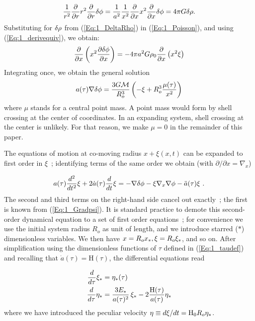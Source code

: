 \begin{equation} 
\label{Eq:1_Poisson} 
\frac{1}{r^2}\frac{\partial}{\partial r} r^2\frac{\partial}{\partial r} \delta\phi =\frac{1}{a^2}\frac{1}{x^2}\frac{\partial}{\partial x} x^2\frac{\partial}{\partial x} \delta\phi  = 4\pi G\delta\rho .
\end{equation}
Substituting for $\delta\rho$ from (\ref{Eq:1_DeltaRho}) in (\ref{Eq:1_Poisson}), and using (\ref{Eq:1_derivequiv}), we obtain:
\begin{equation}
\frac{\partial}{\partial x} \left( x^2 \frac{\partial \delta\phi}{\partial x} \right) = - 4\pi a^2 G \rho_0 \frac{\partial}{\partial x} \left( x^2 \xi \right)
\end{equation}
Integrating once, we obtain the general solution
\begin{equation}
\label{Eq:1_Gradpsi} 
a(\tau)\nabla \delta\phi = \frac{3G{\cal M}}{R_o^3} \left( - \xi + R_o^3\frac{\mu(\tau)}{x^2} \right) 
\end{equation}
where $\mu$ stands for a central point mass. A point mass would form by shell crossing at the center of coordinates. In an expanding system, shell crossing at the center is unlikely. For that reason, we make $ \mu = 0$ in the remainder of this paper.

The equations of motion at co-moving radius $x +\xi(x,t)$ can be expanded to first order in $\xi$~; identifying terms of the same order we obtain (with $\partial/\partial x = \nabla_x$)

\begin{equation} 
a(\tau) \frac{d^2}{d t^2} \xi + 2 \dot{a}(\tau) \frac{d}{dt}\xi = - \nabla\delta\phi - \xi \nabla_x \nabla\phi - \ddot{a}(\tau)\xi \ . 
\end{equation} 
The second and third terms on the right-hand side cancel out exactly~; the first is known from (\ref{Eq:1_Gradpsi}). 
It is standard practice to demote this second-order dynamical equation to a set of first order equations~; for convenience we use the initial system radius $R_o$ as unit of length,  and we introduce starred ($\ast$) dimensionless variables. We then have $x = R_o x_\ast, \xi = R_o\xi_\ast$, and so on.  After simplification using the dimensionless functions of $\tau$  defined in (\ref{Eq:1_taudef}) and recalling that $\dot{a}(\tau) = \textrm{H}(\tau)$, the differential equations read

\begin{subequations}
 \label{Eq:1_system}
    \begin{align}
    	\label{Eq:1_systema}
		\frac{d}{d\tau} \xi_\ast &=  \eta_\ast(\tau)  \\ 
		\label{Eq:1_systemb}
		\frac{d}{d\tau} \eta_\ast &= \frac{3 E_\ast}{a(\tau)^2}\,\xi_\ast - 2 		\frac{\textrm{H}(\tau)}{a(\tau)} \eta_\ast   
	\end{align}
\end{subequations}
where we have introduced the peculiar velocity $\eta \equiv d\xi/dt = {\textrm{H}}_0R_o \eta_\ast$.  


